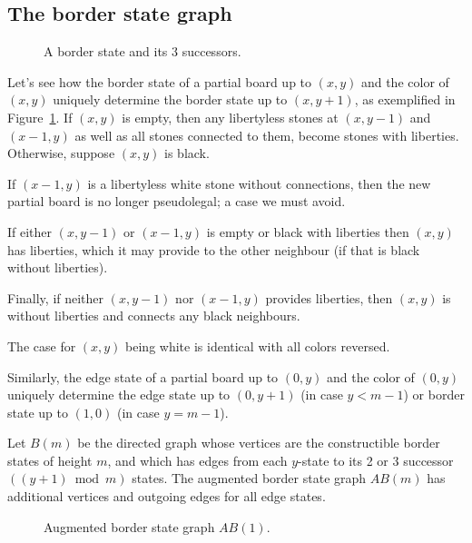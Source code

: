 \documentclass{article}
\begin{document}
\subsection{The border state graph}

\begin{figure}
\epsfxsize=12cm 
\caption{A border state and its 3 successors.}
\label{successors}
\end{figure}

Let's see how
the border state of a partial board up to $(x,y)$ and the color of $(x,y)$
uniquely determine the border state up to $(x,y+1)$,
as exemplified in Figure~\ref{successors}.
If $(x,y)$ is empty, then any libertyless stones at $(x,y-1)$ and $(x-1,y)$
as well as all stones connected to them, become stones with liberties.
Otherwise, suppose $(x,y)$ is black.

If $(x-1,y)$ is a libertyless white stone without connections, then
the new partial board is no longer pseudolegal; a case we must avoid.

If either $(x,y-1)$ or $(x-1,y)$ is empty or
black with liberties then $(x,y)$ has liberties,
which it may provide to the other neighbour
(if that is black without liberties).

Finally, if neither $(x,y-1)$ nor $(x-1,y)$ provides liberties,
then $(x,y)$ is without liberties and connects any black neighbours.

The case for $(x,y)$ being white is identical with all colors reversed.

Similarly, the edge state of a partial board up to $(0,y)$
and the color of $(0,y)$ uniquely determine
the edge state up to $(0,y+1)$ (in case $y<m-1$)
or border state up to $(1,0)$ (in case $y=m-1$).

\begin{defin}
Let $B(m)$ be the directed graph whose vertices are the constructible
border states of height $m$,
and which has edges from each $y$-state to its 2 or 3 successor
$((y+1)\bmod m)$ states.
The augmented border state graph $AB(m)$ has additional vertices and
outgoing edges for all edge states.
\end{defin}

\begin{figure}
\begin{center}
\epsfxsize=5cm 
\end{center}
\caption{Augmented border state graph $AB(1)$.}
\label{onebordergraph}
\end{figure}
\end{document}
